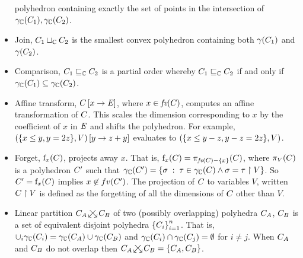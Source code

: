 \begin{itemize}
 polyhedron containing exactly the set of points in the intersection of
 $\gamma_{\mathbb{C}}(C_1), \gamma_{\mathbb{C}}(C_2)$.
\item Join, $C_1 \sqcup_{\mathbb{C}} C_2$ is the smallest convex
 polyhedron containing both $\gamma(C_1)$ and $\gamma(C_2)$.
\item Comparison, $C_1 \sqsubseteq_{\mathbb{C}} C_2$ is a partial order whereby $C_1 \sqsubseteq_{\mathbb{C}} C_2$ if and only if $\gamma_{\mathbb{C}}(C_1) \subseteq \gamma_{\mathbb{C}}(C_2)$.
\item Affine transform, $C \left[ x \rightarrow \mathit{E} \right]$, where $x
  \in \textit{fv}(C) $, computes an affine transformation of $ C $.  This scales
  the dimension corresponding to $x$ by the coefficient of $x$ in
  $\mathit{E}$ and shifts the polyhedron.  For example, $\left( \{x \leq y, y =
  2z\}, V \right) \left[ y \rightarrow z + y \right]$ evaluates to $\left( \{x \leq y - z, y - z =
  2z\}, V \right)$.
\item Forget, $\mathrm{f}_{x}(C)$, projects away $x$.  That is,
  $\mathrm{f}_{x}(C) = \pi_{\textit{fv}(C)-\{x\}}(C)$, where
  $\pi_V(C)$ is a polyhedron $C'$ such that $\gamma_{\mathbb{C}}(C') =
  \{ \sigma \;:\; \tau \in \gamma_{\mathbb{C}}(C) \wedge \sigma =
  \tau \upharpoonright V \}$.  So $C' = \mathrm{f}_{x}(C)$ implies
  $x \not\in fv(C')$. The projection of $ C_{} $ to
  variables $ V $, written $ C_{} \upharpoonright V$ is defined as
  the forgetting of all the dimensions of $ C_{} $ other than $
  V $.
\item{} Linear partition $\partn{\getpoly{A}}{\getpoly{B}}$  
  of two (possibly overlapping) polyhedra $ C_{A} $, $
  C_{B} $ is a set of equivalent disjoint polyhedra $
  \left\{ C_{i} \right\}_{i=1}^{n} $. That is, $ \cup_i \gamma_{\mathbb{C}}(C_{i})
  = \gamma_{\mathbb{C}}(C_{A}) \cup \gamma_{\mathbb{C}}(C_{B}) $ and $
  \gamma_{\mathbb{C}}(C_{i}) \cap \gamma_{\mathbb{C}}(C_{j}) = \emptyset $ for $ i
  \neq j $.  When $C_{A}$ and $C_{B}$ do not overlap then
  $\partn{\getpoly{A}}{\getpoly{B}} = \set{\getpoly{A},\getpoly{B}}$.
\end{itemize}

